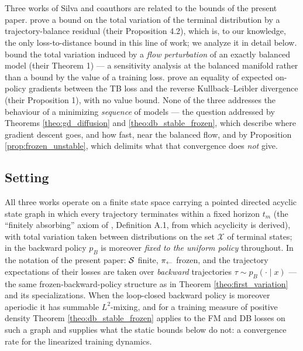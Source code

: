 \section{\appendixBtitle}\label{sec:silva_comparison}

Three works of Silva and coauthors are related to the bounds of the present paper.
\citet{silvageneralization} prove a bound on the total variation of the terminal distribution by a trajectory-balance residual (their Proposition 4.2), which is, to our knowledge, the only loss-to-distance bound in this line of work; we analyze it in detail below.
\citet{silva2025gflownets} bound the total variation induced by a \emph{flow perturbation} of an exactly balanced model (their Theorem 1) --- a sensitivity analysis at the balanced manifold rather than a bound by the value of a training loss.
\citet{silva2024divergence} prove an equality of expected on-policy gradients between the TB loss and the reverse Kullback--Leibler divergence (their Proposition 1), with no value bound.
None of the three addresses the behaviour of a minimizing \emph{sequence} of models --- the question addressed by Theorems \ref{theo:gd_diffusion} and \ref{theo:db_stable_frozen}, which describe where gradient descent goes, and how fast, near the balanced flow, and by Proposition \ref{prop:frozen_unstable}, which delimits what that convergence does \emph{not} give.

\subsection{Setting}

All three works operate on a finite state space carrying a pointed directed acyclic state graph in which every trajectory terminates within a fixed horizon $t_m$ (the ``finitely absorbing'' axiom of \citet{silvageneralization}, Definition A.1, from which acyclicity is derived), with total variation taken between distributions on the set $\mathcal X$ of terminal states; in \citet{silvageneralization} the backward policy $p_B$ is moreover \emph{fixed to the uniform policy} throughout.
In the notation of the present paper: $\mathcal S$ finite, $\pi_{\leftarrow}$ frozen, and the trajectory expectations of their losses are taken over \emph{backward} trajectories $\tau\sim p_B(\cdot\mid x)$ --- the same frozen-backward-policy structure as in Theorem \ref{theo:first_variation} and its specializations.
When the loop-closed backward policy is moreover aperiodic it has summable $L^2$-mixing, and for a training measure of positive density Theorem \ref{theo:db_stable_frozen} applies to the FM and DB losses on such a graph and supplies what the static bounds below do not: a convergence rate for the linearized training dynamics.

